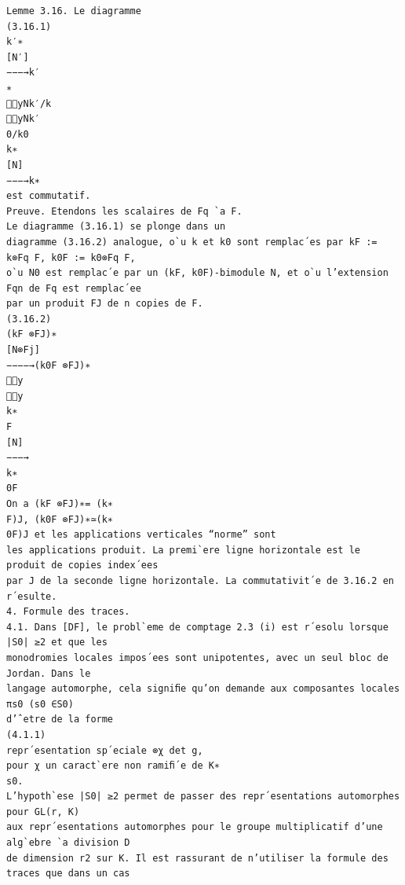 \documentclass[11pt]{article}
\begin{document}
\begin{Verbatim}[breaklines=true,fontsize=\small]
Lemme 3.16. Le diagramme
(3.16.1)
k′∗
[N′]
−−−→k′
∗
yNk′/k
yNk′
0/k0
k∗
[N]
−−−→k∗
est commutatif.
Preuve. Etendons les scalaires de Fq `a F.
Le diagramme (3.16.1) se plonge dans un
diagramme (3.16.2) analogue, o`u k et k0 sont remplac´es par kF := k⊗Fq F, k0F := k0⊗Fq F,
o`u N0 est remplac´e par un (kF, k0F)-bimodule N, et o`u l’extension Fqn de Fq est remplac´ee
par un produit FJ de n copies de F.
(3.16.2)
(kF ⊗FJ)∗
[N⊗Fj]
−−−−→(k0F ⊗FJ)∗
y
y
k∗
F
[N]
−−−→
k∗
0F
On a (kF ⊗FJ)∗= (k∗
F)J, (k0F ⊗FJ)∗≃(k∗
0F)J et les applications verticales “norme” sont
les applications produit. La premi`ere ligne horizontale est le produit de copies index´ees
par J de la seconde ligne horizontale. La commutativit´e de 3.16.2 en r´esulte.
4. Formule des traces.
4.1. Dans [DF], le probl`eme de comptage 2.3 (i) est r´esolu lorsque |S0| ≥2 et que les
monodromies locales impos´ees sont unipotentes, avec un seul bloc de Jordan. Dans le
langage automorphe, cela signiﬁe qu’on demande aux composantes locales πs0 (s0 ∈S0)
d’ˆetre de la forme
(4.1.1)
repr´esentation sp´eciale ⊗χ det g,
pour χ un caract`ere non ramiﬁ´e de K∗
s0.
L’hypoth`ese |S0| ≥2 permet de passer des repr´esentations automorphes pour GL(r, K)
aux repr´esentations automorphes pour le groupe multiplicatif d’une alg`ebre `a division D
de dimension r2 sur K. Il est rassurant de n’utiliser la formule des traces que dans un cas


\end{Verbatim}
\end{document}
